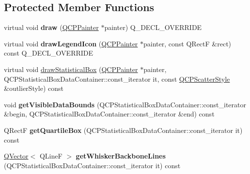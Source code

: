 \subsection*{Protected Member Functions}
\begin{DoxyCompactItemize}
\item 
\mbox{\label{class_q_c_p_statistical_box_afcff35fa79728cfe10e80e0702014fea}} 
virtual void {\bfseries draw} (\hyperlink{class_q_c_p_painter}{Q\+C\+P\+Painter} $\ast$painter) Q\+\_\+\+D\+E\+C\+L\+\_\+\+O\+V\+E\+R\+R\+I\+DE
\item 
\mbox{\label{class_q_c_p_statistical_box_ad286c63a79c21d5231a4b6c6fdbb914f}} 
virtual void {\bfseries draw\+Legend\+Icon} (\hyperlink{class_q_c_p_painter}{Q\+C\+P\+Painter} $\ast$painter, const Q\+RectF \&rect) const Q\+\_\+\+D\+E\+C\+L\+\_\+\+O\+V\+E\+R\+R\+I\+DE
\item 
virtual void \hyperlink{class_q_c_p_statistical_box_a02dc6b561be8203d460d7263da74b8a9}{draw\+Statistical\+Box} (\hyperlink{class_q_c_p_painter}{Q\+C\+P\+Painter} $\ast$painter, Q\+C\+P\+Statistical\+Box\+Data\+Container\+::const\+\_\+iterator it, const \hyperlink{class_q_c_p_scatter_style}{Q\+C\+P\+Scatter\+Style} \&outlier\+Style) const
\item 
\mbox{\label{class_q_c_p_statistical_box_a1c24e86384a4aced91d5216fce86b175}} 
void {\bfseries get\+Visible\+Data\+Bounds} (Q\+C\+P\+Statistical\+Box\+Data\+Container\+::const\+\_\+iterator \&begin, Q\+C\+P\+Statistical\+Box\+Data\+Container\+::const\+\_\+iterator \&end) const
\item 
\mbox{\label{class_q_c_p_statistical_box_aa44482bf991ceca74602294dd9977243}} 
Q\+RectF {\bfseries get\+Quartile\+Box} (Q\+C\+P\+Statistical\+Box\+Data\+Container\+::const\+\_\+iterator it) const
\item 
\mbox{\label{class_q_c_p_statistical_box_a233c28f8c2464ed104a4d580eedd4c64}} 
\hyperlink{class_q_vector}{Q\+Vector}$<$ Q\+LineF $>$ {\bfseries get\+Whisker\+Backbone\+Lines} (Q\+C\+P\+Statistical\+Box\+Data\+Container\+::const\+\_\+iterator it) const
\item 
\mbox{\label{class_q_c_p_statistical_box_af478f6e8a5e9ca2f1bbac10a6b73319a}} 

\end{DoxyCompactItemize}
